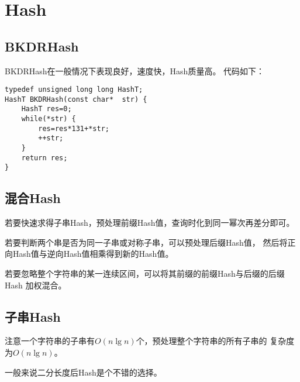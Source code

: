 \section{Hash}
\subsection{BKDRHash}
BKDRHash在一般情况下表现良好，速度快，Hash质量高。
代码如下：
\begin{lstlisting}
typedef unsigned long long HashT;
HashT BKDRHash(const char*  str) {
    HashT res=0;
    while(*str) {
        res=res*131+*str;
        ++str;
    }
    return res;
}
\end{lstlisting}
\subsection{混合Hash}
若要快速求得子串Hash，预处理前缀Hash值，查询时化到同一幂次再差分即可。

若要判断两个串是否为同一子串或对称子串，可以预处理后缀Hash值，
然后将正向Hash值与逆向Hash值相乘得到新的Hash值。

若要忽略整个字符串的某一连续区间，可以将其前缀的前缀Hash与后缀的后缀Hash
加权混合。
\subsection{子串Hash}
注意一个字符串的子串有$O(n\lg n)$个，预处理整个字符串的所有子串的
复杂度为$O(n\lg n)$。

一般来说二分长度后Hash是个不错的选择。
